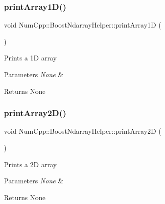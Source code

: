 \subsubsection{\texorpdfstring{print\+Array1\+D()}{printArray1D()}}
{\footnotesize\ttfamily void Num\+Cpp\+::\+Boost\+Ndarray\+Helper\+::print\+Array1D (\begin{DoxyParamCaption}{ }\end{DoxyParamCaption})\hspace{0.3cm}{\ttfamily [inline]}}

Prints a 1D array


\begin{DoxyParams}{Parameters}
{\em None} & \\
\hline
\end{DoxyParams}
\begin{DoxyReturn}{Returns}
None 
\end{DoxyReturn}
\mbox{\label{class_num_cpp_1_1_boost_ndarray_helper_ab2699f035965b1fc1b40c1186526dad0}} 
\subsubsection{\texorpdfstring{print\+Array2\+D()}{printArray2D()}}
{\footnotesize\ttfamily void Num\+Cpp\+::\+Boost\+Ndarray\+Helper\+::print\+Array2D (\begin{DoxyParamCaption}{ }\end{DoxyParamCaption})\hspace{0.3cm}{\ttfamily [inline]}}

Prints a 2D array


\begin{DoxyParams}{Parameters}
{\em None} & \\
\hline
\end{DoxyParams}
\begin{DoxyReturn}{Returns}
None 
\end{DoxyReturn}
\mbox{\label{class_num_cpp_1_1_boost_ndarray_helper_a4254a64f9aa17d65262a563f1a04b1db}} 
